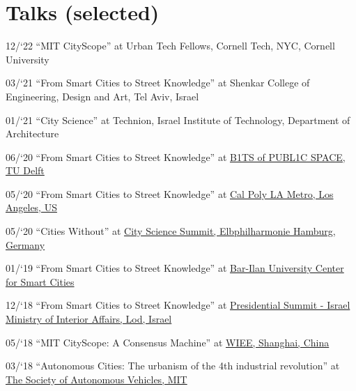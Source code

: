 \section*{Talks (selected)}

\begin{tablist}

    \item[12/`22] \tab \enquote{MIT CityScope} at
    {Urban Tech Fellows, Cornell Tech, NYC, Cornell University }

    \item[03/`21] \tab \enquote{From Smart Cities to Street Knowledge} at
    {Shenkar College of Engineering, Design and Art, Tel Aviv, Israel}

    \item[01/`21] \tab \enquote{City Science} at
    {Technion, Israel Institute of Technology, Department of Architecture}

    \item[06/`20] \tab \enquote{From Smart Cities to Street Knowledge} at
    \href{http://www.polistudelft.nl/urbanism-week/b1ts-of-publ1c-space-3-0/}{B1TS of PUBL1C SPACE, TU Delft}

    \item[05/`20] \tab \enquote{From Smart Cities to Street Knowledge} at
    \href{https://www.youtube.com/watch?v=Rh5ks9x3720}{Cal Poly LA Metro, Los Angeles, US}

    \item[05/`20] \tab \enquote{Cities Without} at
    \href{https://www.youtube.com/watch?v=PZg6A_A65lQ}{City Science Summit, Elbphilharmonie Hamburg, Germany}

    \item[01/`19] \tab \enquote{From Smart Cities to Street Knowledge} at
    \href{https://law.biu.ac.il/sites/law/files/shared/mrym_khkmvt_lkhkmt_hrkhvb.pdf}{
        Bar-Ilan University Center for Smart Cities}

    \item[12/`18] \tab \enquote{From Smart Cities to Street Knowledge} at
    \href{https://www.youtube.com/watch?v=skIEkM9-1yg}{Presidential Summit - Israel Ministry of Interior Affairs, Lod, Israel}

    \item[05/`18] \tab \enquote{MIT CityScope: A Consensus Machine} at
    \href{https://wiee.tongji.edu.cn/CSS2018/}{WIEE, Shanghai, China}

    \item[03/`18] \tab \enquote{Autonomous Cities: The urbanism of the 4th industrial revolution} at \href{http://cameraculture.media.mit.edu/category/blog/}{The Society of Autonomous Vehicles, MIT}


\end{tablist}
